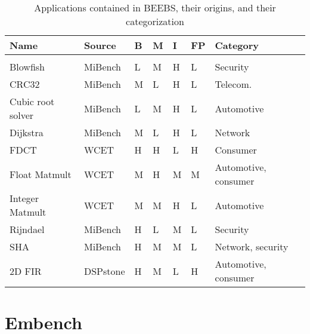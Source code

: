\documentclass[../bachelor_paper.tex]{subfiles}
\begin{document}
\begin{table}
    \centering
    \begin{tabular}{lllllll}
    \textbf{Name}   & \textbf{Source}   & \textbf{B} & \textbf{M} & \textbf{I} & \textbf{FP}    & \textbf{Category} \\
    \hline\\[-0.9em]
    Blowfish        & MiBench   & L & M & H & L & Security \\
    CRC32           & MiBench   & M & L & H & L & Telecom. \\
    Cubic root solver & MiBench & L & M & H & L & Automotive \\
    Dijkstra        & MiBench   & M & L & H & L & Network  \\
    FDCT            & WCET      & H & H & L & H & Consumer \\
    Float Matmult   & WCET      & M & H & M & M & Automotive, consumer \\
    Integer Matmult & WCET      & M & M & H & L & Automotive \\
    Rijndael        & MiBench   & H & L & M & L & Security \\
    SHA             & MiBench   & H & M & M & L & Network, security \\
    2D FIR          & DSPstone  & H & M & L & H & Automotive, consumer \\
    \hline
    \end{tabular}
    \caption{Applications contained in BEEBS, their origins, and their categorization \cite{pallisterBEEBSOpenBenchmarks2013}}
    \label{tab:bench/beebs/apps}
\end{table}

\section{Embench}
\isstandalone



\fi
\end{document}
